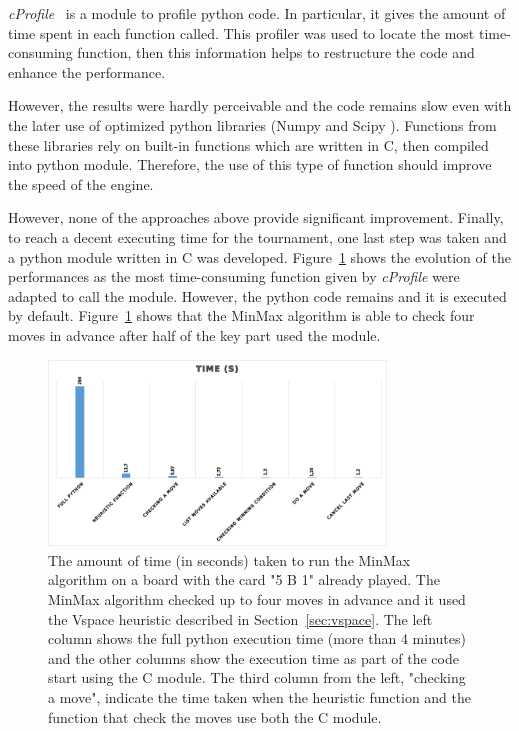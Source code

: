\documentclass[runningheads]{llncs}
\begin{document}
\textit{cProfile}~\cite{cprofile} is a module to profile
python code. In particular,
it gives the amount of time spent in each function
called. This profiler was used to locate the most
time-consuming function, then this information
helps to restructure the code and enhance the
performance.

However, the results were hardly perceivable and
the code remains slow even with the later use of
optimized python libraries (Numpy and Scipy
\cite{numpy}). Functions from these libraries rely
on built-in functions which are written in C, then
compiled into python module.  Therefore, the use
of this type of function should improve the speed
of the engine.

However, none of the approaches above provide significant improvement. Finally,
to reach a decent executing time for the tournament, one last step was taken
and a python module written in C was developed.
Figure~\ref{fig:performance-magic} shows the
evolution of the performances as the most time-consuming function given by \textit{cProfile} were adapted to call the
module. However, the python code remains and it is
executed by default. 
Figure~\ref{fig:performance-magic} shows that the
MinMax algorithm is able to check four moves in
advance after half of the key part used the
module.

\begin{figure}
		\centering
		\includegraphics[width=0.8\textwidth]{perfromances.png}
		\caption{The amount of time (in seconds) taken
		to run the MinMax algorithm on a board with the
		card "5 B 1" already played. The MinMax
		algorithm checked up to four moves in advance and
		it used the Vspace heuristic described in
		Section~\ref{sec:vspace}. The left column
		shows the full python execution time (more
		than 4 minutes) and the other columns show the
		execution time as part of the code start using
		the C module. The third column from the left,
		"checking a move", indicate the time taken
		when the heuristic function and the function
		that check the moves use both the C module.}
		\label{fig:performance-magic}
\end{figure}
\end{document}
